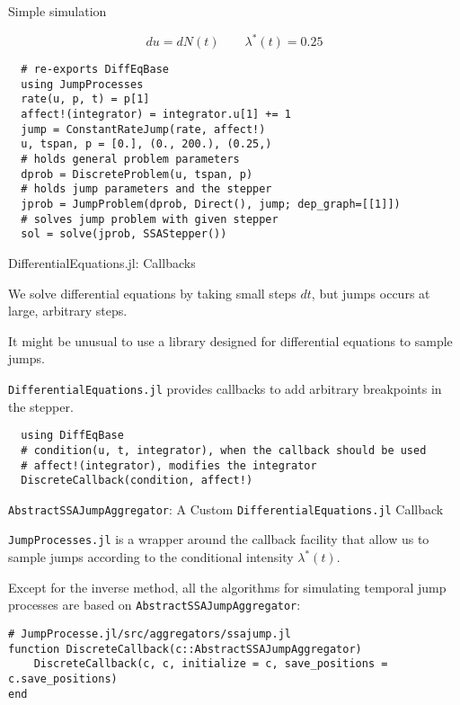 \documentclass[
  ignorenonframetext,
  aspectratio=169,
  xcolor={dvipsnames,rgb}
]{beamer}
\begin{document}
\begin{frame}[fragile]{Simple simulation}

\[
  du = d N(t) \qquad \lambda^\ast (t) = 0.25
\]

\vspace{-1em}

\begin{lstlisting}
  # re-exports DiffEqBase
  using JumpProcesses
  rate(u, p, t) = p[1]
  affect!(integrator) = integrator.u[1] += 1
  jump = ConstantRateJump(rate, affect!)
  u, tspan, p = [0.], (0., 200.), (0.25,)
  # holds general problem parameters
  dprob = DiscreteProblem(u, tspan, p)
  # holds jump parameters and the stepper
  jprob = JumpProblem(dprob, Direct(), jump; dep_graph=[[1]])
  # solves jump problem with given stepper
  sol = solve(jprob, SSAStepper())
\end{lstlisting}

\end{frame}

\begin{frame}[fragile]{DifferentialEquations.jl: Callbacks}

We solve differential equations by taking small steps \( dt \), but jumps occurs at large, arbitrary steps.

It might be unusual to use a library designed for differential equations to sample jumps. 

\texttt{DifferentialEquations.jl} provides callbacks to add arbitrary breakpoints in the stepper.

\begin{lstlisting}
  using DiffEqBase
  # condition(u, t, integrator), when the callback should be used
  # affect!(integrator), modifies the integrator
  DiscreteCallback(condition, affect!)
\end{lstlisting}

\end{frame}

\begin{frame}[fragile]{\texttt{AbstractSSAJumpAggregator}: A Custom \texttt{DifferentialEquations.jl} Callback}

\texttt{JumpProcesses.jl} is a wrapper around the callback facility that allow us to sample jumps according to the conditional intensity \( \lambda^\ast (t) \).

Except for the inverse method, all the algorithms for simulating temporal jump processes are based on \texttt{AbstractSSAJumpAggregator}:
\vspace{-1em}
\begin{lstlisting}
# JumpProcesse.jl/src/aggregators/ssajump.jl
function DiscreteCallback(c::AbstractSSAJumpAggregator)
    DiscreteCallback(c, c, initialize = c, save_positions = c.save_positions)
end
\end{lstlisting}
\vspace{-1em}

\end{frame}
\end{document}
